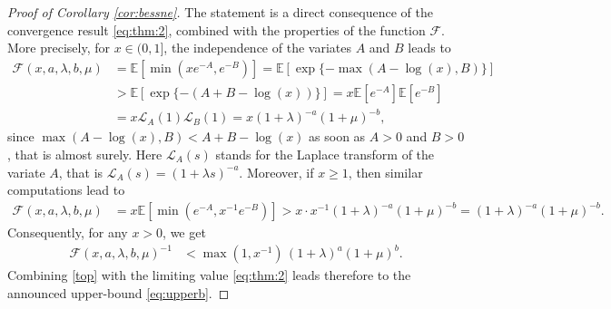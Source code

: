 \documentclass[12pt]{article}
\numberwithin{equation}{section}
\begin{document}
\begin{proof}[Proof of Corollary \ref{cor:bessne}] The statement is a direct consequence of the convergence result \eqref{eq:thm:2}, combined with the properties of the function $\mathcal{F}$. More precisely, for $x\in(0,1]$, the independence of the variates $A$ and $B$ leads to
\begin{align*}
\mathcal{F}(x,a,\lambda,b,\mu)&=\mathbb{E}[\min(x e^{-A},e^{-B})]=\mathbb{E}[\exp\{-\max(A-\log(x),B)\}]\\
&> \mathbb{E}[\exp\{-(A+B-\log(x))\}]=x\mathbb{E}[e^{-A}]\mathbb{E}[e^{-B}]\\
&=x\mathcal{L}_A(1)\mathcal{L}_B(1)=x(1+\lambda)^{-a}(1+\mu)^{-b},
\end{align*}
 since $\max(A-\log(x),B)<A+B-\log(x)$ as soon as $A>0$ and $B>0$, that is almost surely.
Here $\mathcal{L}_{A}(s)$ stands for the Laplace transform of the variate $A$, that is
\(
\mathcal{L}_{A}(s)=(1+\lambda s)^{-a}
\). Moreover, if $x\ge 1$, then similar computations lead to
\begin{align*}
\mathcal{F}(x,a,\lambda,b,\mu)&=x\mathbb{E}[\min(e^{-A},x^{-1}e^{-B})]> x\cdot x^{-1}(1+\lambda)^{-a}(1+\mu)^{-b}=(1+\lambda)^{-a}(1+\mu)^{-b}.
\end{align*}
Consequently, for any $x>0$, we get
\begin{align}\label{top}
\mathcal{F}(x,a,\lambda,b,\mu)^{-1}&< \max(1,x^{-1})\,(1+\lambda)^{a}(1+\mu)^{b}.
\end{align}
Combining \eqref{top} with the limiting value \eqref{eq:thm:2} leads therefore to the announced upper-bound \eqref{eq:upperb}.
\end{proof}
\end{document}

